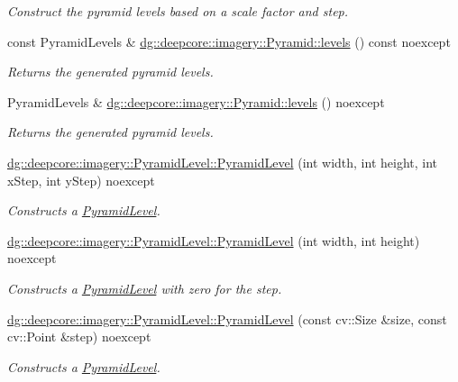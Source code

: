 \begin{DoxyCompactItemize}
\begin{DoxyCompactList}\small\item\em Construct the pyramid levels based on a scale factor and step. \end{DoxyCompactList}\item 
const Pyramid\+Levels \& \hyperlink{group___imagery_module_ga91d47b866ba5242dd28833d4c7607b1b}{dg\+::deepcore\+::imagery\+::\+Pyramid\+::levels} () const noexcept
\begin{DoxyCompactList}\small\item\em Returns the generated pyramid levels. \end{DoxyCompactList}\item 
Pyramid\+Levels \& \hyperlink{group___imagery_module_gacabef885d8fcdf548631bcf134e17298}{dg\+::deepcore\+::imagery\+::\+Pyramid\+::levels} () noexcept
\begin{DoxyCompactList}\small\item\em Returns the generated pyramid levels. \end{DoxyCompactList}\item 
\hyperlink{group___imagery_module_ga6e5a71cc3c52efc7890ebb8d2151b35d}{dg\+::deepcore\+::imagery\+::\+Pyramid\+Level\+::\+Pyramid\+Level} (int width, int height, int x\+Step, int y\+Step) noexcept
\begin{DoxyCompactList}\small\item\em Constructs a \hyperlink{structdg_1_1deepcore_1_1imagery_1_1_pyramid_level}{Pyramid\+Level}. \end{DoxyCompactList}\item 
\hyperlink{group___imagery_module_ga9675c2d85800ca99ea908f26996dbcc1}{dg\+::deepcore\+::imagery\+::\+Pyramid\+Level\+::\+Pyramid\+Level} (int width, int height) noexcept
\begin{DoxyCompactList}\small\item\em Constructs a \hyperlink{structdg_1_1deepcore_1_1imagery_1_1_pyramid_level}{Pyramid\+Level} with zero for the step. \end{DoxyCompactList}\item 
\hyperlink{group___imagery_module_gab23e577c28dd7a700976dc26cef3db76}{dg\+::deepcore\+::imagery\+::\+Pyramid\+Level\+::\+Pyramid\+Level} (const cv\+::\+Size \&size, const cv\+::\+Point \&step) noexcept
\begin{DoxyCompactList}\small\item\em Constructs a \hyperlink{structdg_1_1deepcore_1_1imagery_1_1_pyramid_level}{Pyramid\+Level}. \end{DoxyCompactList}\item 

\end{DoxyCompactItemize}
